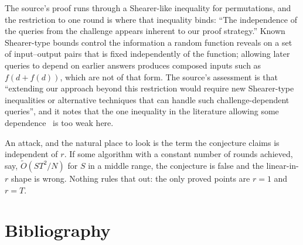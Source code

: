 \documentclass{conjura-conjecture}
\newcommand{\Ot}{\widetilde{O}}
\begin{document}
\begin{remark}
The source's proof runs through a Shearer-like inequality for
permutations, and the restriction to one round is where that inequality
binds: ``The independence of the queries from the challenge appears
inherent to our proof strategy.'' Known Shearer-type bounds control the
information a random function reveals on a set of input--output pairs
that is fixed independently of the function; allowing later queries to
depend on earlier answers produces composed inputs such as
$f(d + f(d))$, which are not of that form. The source's assessment is
that ``extending our approach beyond this restriction would require new
Shearer-type inequalities or alternative techniques that can handle
such challenge-dependent queries'', and it notes that the one
inequality in the literature allowing some dependence~\cite{RS18} is
too weak here.
\end{remark}

\begin{remark}
An attack, and the natural place to look is the term the conjecture
claims is independent of $r$. If some algorithm with a constant number
of rounds achieved, say, $\Ot(S T^{2}/N)$ for $S$ in a middle range,
the conjecture is false and the linear-in-$r$ shape is wrong. Nothing
rules that out: the only proved points are $r = 1$ and $r = T$.
\end{remark}

\section{Bibliography}
\end{document}
